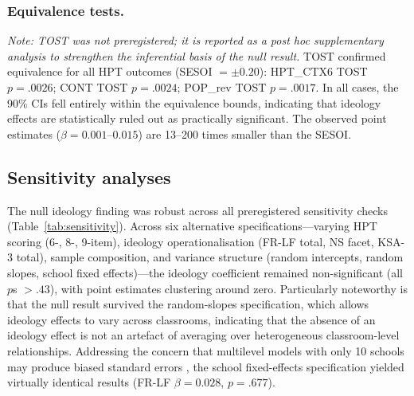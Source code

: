 \documentclass[pdflatex,sn-apa]{sn-jnl}%
\begin{document}
\subsubsection{Equivalence tests.}\label{subsubsec:tost}

\emph{Note: TOST was not preregistered; it is reported as a post hoc supplementary analysis to strengthen the inferential basis of the null result.} TOST confirmed equivalence for all HPT outcomes (SESOI $= \pm 0.20$): HPT\_CTX6 TOST $p = .0026$; CONT TOST $p = .0024$; POP\_rev TOST $p = .0017$. In all cases, the 90\% CIs fell entirely within the equivalence bounds, indicating that ideology effects are statistically ruled out as practically significant. The observed point estimates ($\beta = 0.001$--$0.015$) are 13--200 times smaller than the SESOI.

\subsection{Sensitivity analyses}\label{subsec:sensitivity}

The null ideology finding was robust across all preregistered sensitivity checks (Table~\ref{tab:sensitivity}). Across six alternative specifications---varying HPT scoring (6-, 8-, 9-item), ideology operationalisation (FR-LF total, NS facet, KSA-3 total), sample composition, and variance structure (random intercepts, random slopes, school fixed effects)---the ideology coefficient remained non-significant (all $p$s $> .43$), with point estimates clustering around zero. Particularly noteworthy is that the null result survived the random-slopes specification, which allows ideology effects to vary across classrooms, indicating that the absence of an ideology effect is not an artefact of averaging over heterogeneous classroom-level relationships. Addressing the concern that multilevel models with only 10 schools may produce biased standard errors \citep{Maas2005}, the school fixed-effects specification yielded virtually identical results (FR-LF $\beta = 0.028$, $p = .677$).
\end{document}
